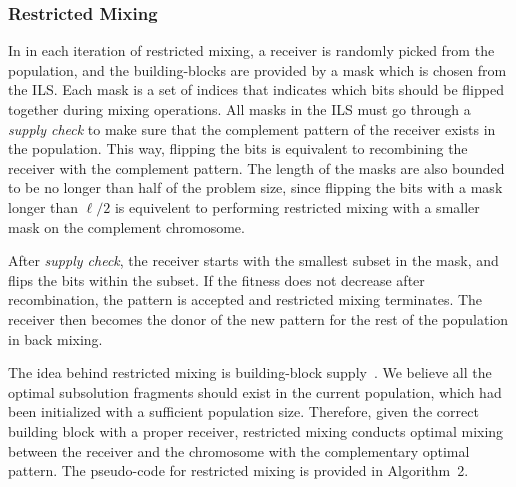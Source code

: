 \documentclass{sig-alternate-05-2015}
\begin{document}
\subsubsection{Restricted Mixing}

In in each iteration of restricted mixing, a receiver is randomly picked from the population, and the building-blocks are provided by a mask which is chosen from the ILS. 
Each mask is a set of indices that indicates which bits should be flipped together during mixing operations. 
All masks in the ILS must go through a \textit{supply check} to make sure that the complement pattern of the receiver exists in the population. 
This way, flipping the bits is equivalent to recombining the receiver with the complement pattern. 
The length of the masks are also bounded to be no longer than half of the problem size, since flipping the bits with a mask longer than $\ell/2$ is equivelent to performing restricted mixing with a smaller mask on the complement chromosome. 


After \textit{supply check}, the receiver starts with the smallest subset in the mask, and flips the bits within the subset. 
If the fitness does not decrease after recombination, the pattern is accepted and restricted mixing terminates. 
The receiver then becomes the donor of the new pattern for the rest of the population in back mixing. 


The idea behind restricted mixing is building-block supply~\cite{goldberg:buildingblock}. We believe all the optimal subsolution fragments should exist in the current population, which had been initialized with a sufficient population size. Therefore, given the correct building block with a proper receiver, restricted mixing conducts optimal mixing between the receiver and the chromosome with the complementary optimal pattern. 
The pseudo-code for  restricted mixing is provided in Algorithm~2.
\end{document}
